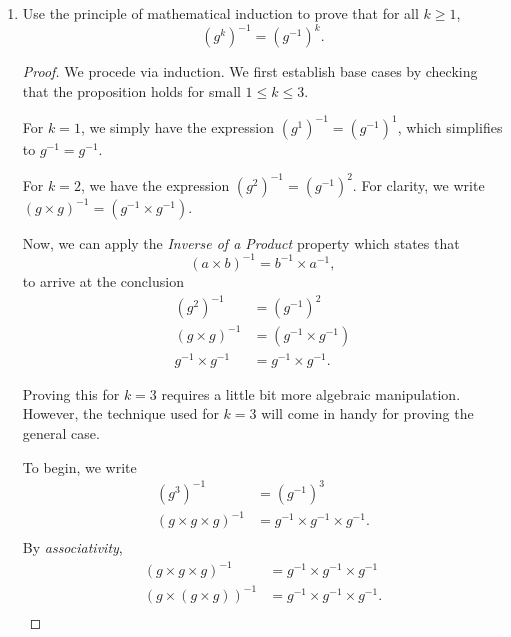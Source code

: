 \documentclass{article}
\begin{document}
\begin{enumerate}
    \item {
        Use the principle of mathematical induction to prove that for all \(k \geq 1\),
        \[(g^k)^{-1} = (g^{-1})^k.\]

        \begin{proof}
            We procede via induction. We first establish base cases by checking 
            that the proposition holds for small \(1 \le k \le 3\). 

            For \(k = 1\), we simply have the expression \((g^1)^{-1} = (g^{-1})^1\),
            which simplifies to \(g^{-1} = g^{-1}\). 

            For \(k = 2\), we have the expression \((g^2)^{-1} = (g^{-1})^2\).
            For clarity, we write \((g \times g)^{-1} = (g^{-1} \times g^{-1})\).

            Now, we can apply the \emph{Inverse of a Product} property which states 
            that \[ (a \times b)^{-1} = b^{-1} \times a^{-1},\]
            to arrive at the conclusion 
            \begin{align*}
                (g^2)^{-1} &= (g^{-1})^2 \\
                (g \times g)^{-1} &= (g^{-1} \times g^{-1}) \\
                g^{-1} \times g^{-1} &= g^{-1} \times g^{-1}.
            \end{align*}

            Proving this for \(k = 3\) requires a little bit more algebraic 
            manipulation. However, the technique used for \(k = 3\) will come in 
            handy for proving the general case. 

            To begin, we write
            \begin{align*}
                (g^3)^{-1} &= (g^{-1})^3 \\
                (g \times g \times g)^{-1} &= g^{-1} \times g^{-1} \times g^{-1}. \\
            \end{align*}
            By \emph{associativity},
            \begin{align*}
                (g \times g \times g)^{-1} &= g^{-1} \times g^{-1} \times g^{-1} \\
                (g \times (g \times g))^{-1} &= g^{-1} \times g^{-1} \times g^{-1}. \\
            \end{align*}


\end{proof}}
\end{enumerate}
\end{document}

